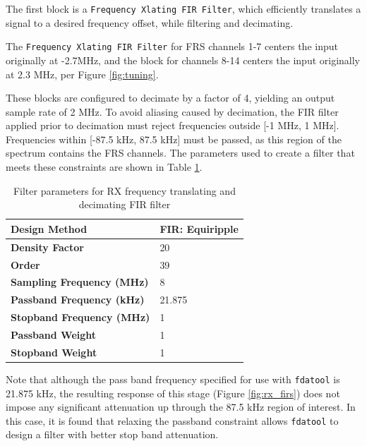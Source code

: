 The first block is a \texttt{Frequency Xlating FIR Filter}, which efficiently
translates a signal to a desired frequency offset, while filtering and
decimating.

The \texttt{Frequency Xlating FIR Filter} for \ac{FRS} channels 1-7 centers
the input originally at -2.7MHz, and the block for channels 8-14 centers the
input originally at 2.3 MHz, per Figure \ref{fig:tuning}.

These blocks are configured to decimate by a factor of 4, yielding an output
sample rate of 2 MHz. To avoid aliasing caused by decimation, the \ac{FIR}
filter applied prior to decimation must reject frequencies outside [-1 MHz, 1
MHz]. Frequencies within [-87.5 kHz, 87.5 kHz] must be passed, as this region
of the spectrum contains the \ac{FRS} channels. The parameters used to create a
filter that meets these constraints are shown in Table \ref{tab:rx_xlat_fir}.

\begin{table}[h]
  \centering
  \caption{Filter parameters for RX frequency translating and decimating FIR filter}
  \label{tab:rx_xlat_fir}
  \footnotesize
  \begin{tabular} {|l|l|}
    \hline
    \textbf{Design Method}              & FIR: Equiripple \\ \hline
    \textbf{Density Factor}             & 20              \\ \hline
    \textbf{Order}                      & 39              \\ \hline
    \textbf{Sampling Frequency (MHz)}   & 8               \\ \hline
    \textbf{Passband Frequency (kHz)}   & 21.875          \\ \hline
    \textbf{Stopband Frequency (MHz)}   & 1               \\ \hline
    \textbf{Passband Weight}            & 1               \\ \hline
    \textbf{Stopband Weight}            & 1               \\ \hline
  \end{tabular}
\end{table}

Note that although the pass band frequency specified for use with
\texttt{fdatool} is 21.875 kHz, the resulting response of this stage (Figure
\ref{fig:rx_firs}) does not impose any significant attenuation up through
the 87.5 kHz region of interest. In this case, it is found that relaxing the
passband constraint allows \texttt{fdatool} to design a filter with better
stop band attenuation.

